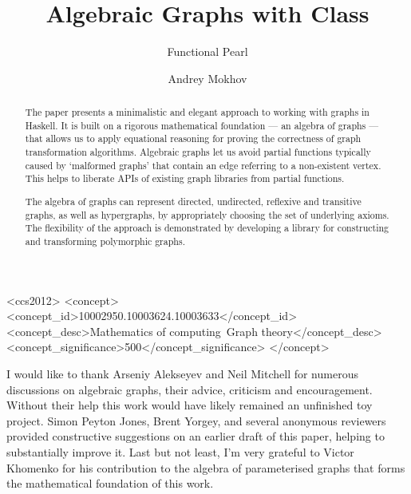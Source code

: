 \documentclass[sigplan]{acmart}
\begin{document}
\title{Algebraic Graphs with Class\vspace{-1.5mm}}
\subtitle{Functional Pearl}

\author{Andrey Mokhov}

\begin{abstract}
\vspace{-1mm}
The paper presents a minimalistic and elegant approach to working
with graphs in Haskell. It is built on a rigorous
mathematical foundation --- an algebra of graphs --- that allows us to apply
equational reasoning for proving the correctness of graph transformation
algorithms. Algebraic graphs let us avoid partial functions typically
caused by `malformed graphs' that contain an edge referring to
a non-existent vertex. This helps to liberate APIs of existing graph libraries
from partial functions.

The algebra of graphs can represent directed, undirected, reflexive
and transitive graphs, as well as hypergraphs, by appropriately choosing
the set of underlying axioms. The flexibility of the approach is
demonstrated by developing a library for constructing
and transforming polymorphic graphs.
\end{abstract}

\begin{CCSXML}
<ccs2012>
<concept>
<concept_id>10002950.10003624.10003633</concept_id>
<concept_desc>Mathematics of computing~Graph theory</concept_desc>
<concept_significance>500</concept_significance>
</concept>
\end{CCSXML}


\maketitle









\begin{acks}
  I would like to thank Arseniy Alekseyev and Neil Mitchell
  for numerous discussions on algebraic graphs, their advice,
  criticism and encouragement. Without their help this work would
  have likely remained an unfinished toy project.
  Simon Peyton Jones, Brent Yorgey, and several anonymous reviewers
  provided constructive suggestions on an earlier draft of this paper,
  helping to substantially improve it. Last but not least, I'm very
  grateful to Victor Khomenko for his contribution to the algebra of
  parameterised graphs that forms the mathematical foundation of this work.
\end{acks}


\end{document}
